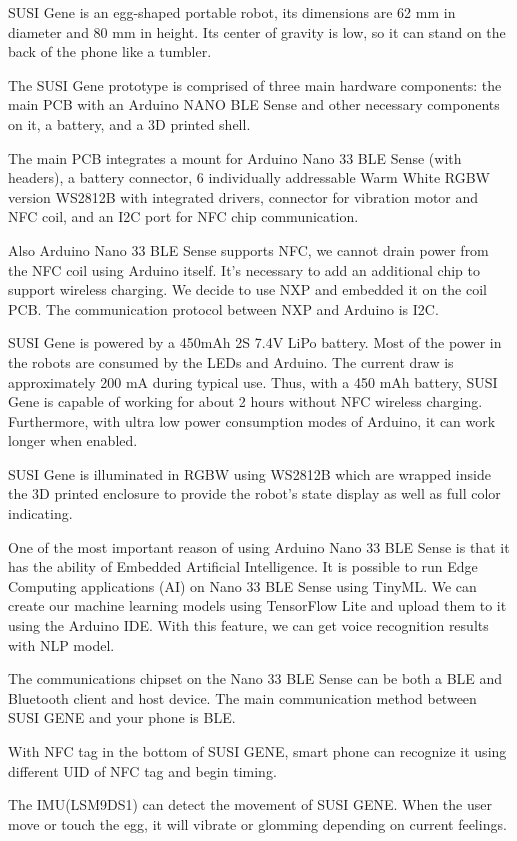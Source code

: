 \documentclass[manuscript,screen]{acmart}
\begin{document}
SUSI Gene is an egg-shaped portable robot, its dimensions are 62 mm in diameter and 80 mm in height. Its center of gravity is low, so it can stand on the back of the phone like a tumbler.

The SUSI Gene prototype is comprised of three main hardware components: the main PCB with an Arduino NANO BLE Sense and other necessary components on it, a battery, and a 3D printed shell.

The main PCB integrates a mount for Arduino Nano 33 BLE Sense (with headers), a battery connector, 6 individually addressable Warm White RGBW version WS2812B with integrated drivers, connector for vibration motor and NFC coil, and an I2C port for NFC chip communication.

Also Arduino Nano 33 BLE Sense supports NFC, we cannot drain power from the NFC coil using Arduino itself. It's necessary to add an additional chip to support wireless charging. We decide to use NXP and embedded it on the coil PCB. The communication protocol between NXP and Arduino is I2C.

SUSI Gene is powered by a 450mAh 2S 7.4V LiPo battery. Most of the power in the robots are consumed by the LEDs and Arduino. The current draw is approximately 200 mA during typical use. Thus, with a 450 mAh battery, SUSI Gene is capable of working for about 2 hours without NFC wireless charging. Furthermore, with ultra low power consumption modes of Arduino, it can work longer when enabled.

SUSI Gene is illuminated in RGBW using WS2812B which are wrapped inside the 3D printed enclosure to provide the robot’s state display as well as full color indicating.

One of the most important reason of using Arduino Nano 33 BLE Sense is that it has the ability of Embedded Artificial Intelligence. It is possible to run Edge Computing applications (AI) on Nano 33 BLE Sense using TinyML. We can create our machine learning models using TensorFlow Lite and upload them to it using the Arduino IDE. With this feature, we can get voice recognition results with NLP model.

The communications chipset on the Nano 33 BLE Sense can be both a BLE and Bluetooth client and host device. The main communication method between SUSI GENE and your phone is BLE.

With NFC tag in the bottom of SUSI GENE, smart phone can recognize it using different UID of NFC tag and begin timing.

The IMU(LSM9DS1) can detect the movement of SUSI GENE. When the user move or touch the egg, it will vibrate or glomming depending on current feelings.
\end{document}
